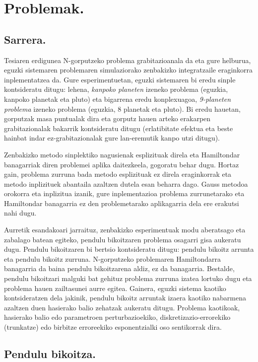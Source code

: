 \chapter{Problemak.}

\section{Sarrera.}


Tesiaren erdigunea N-gorputzeko problema grabitazioanala da eta gure helburua, eguzki sistemaren problemaren simulaziorako zenbakizko integratzaile eraginkorra inplementatzea da. Gure esperimentuetan, eguzki sistemaren bi eredu sinple kontsideratu ditugu: lehena, \emph{kanpoko planeten} izeneko problema (eguzkia, kanpoko planetak eta pluto) eta bigarrena eredu konplexuagoa, \emph{9-planeten problema} izeneko problema (eguzkia, 8 planetak eta pluto). Bi eredu hauetan, gorputzak masa puntualak dira eta gorputz hauen arteko erakarpen grabitazionalak bakarrik kontsideratu ditugu (erlatibitate efektua eta beste hainbat indar ez-grabitazionalak gure lan-eremutik kanpo utzi ditugu).

Zenbakizko metodo sinplektiko nagusienak esplizituak direla eta Hamiltondar banagarriak diren problemei aplika daitezkeela, gogoratu behar dugu. Hortaz gain, problema zurruna bada metodo esplizituak ez direla eraginkorrak eta metodo inplizituek abantaila azaltzen dutela esan beharra dago. Gauss metodoa orokorra  eta inplizitua izanik, gure inplementazioa problema zurrunetarako eta Hamiltondar banagarria ez den problemetarako  aplikagarria dela ere erakutsi nahi dugu. 
 
Aurretik esandakoari jarraituz, zenbakizko esperimentuak modu aberatsago eta zabalago batean egiteko, pendulu bikoitzaren problema osagarri gisa aukeratu dugu. Pendulu bikoitzaren bi bertsio kontsideratu ditugu: pendulu bikoitz arrunta eta pendulu bikoitz zurruna. N-gorputzeko problemaren Hamiltondarra banagarria da baina pendulu bikoitzarena aldiz, ez da banagarria. Bestalde, pendulu bikoitzari malguki bat gehituz  problema zurruna izatea lortuko dugu eta problema hauen zailtasunei aurre egitea. Gainera,  eguzki sistema kaotiko  kontsideratzen dela \cite{Laskar1999} jakinik, pendulu bikoitz arruntak izaera kaotiko nabarmena azaltzen duen hasierako balio zehatzak aukeratu ditugu. Problema kaotikoak,  hasierako balio edo parametroen perturbazioekiko, diskretizazio-errorekiko (trunkatze) edo birbitze erroreekiko esponentzialki oso sentikorrak dira.


\section{Pendulu bikoitza.}

